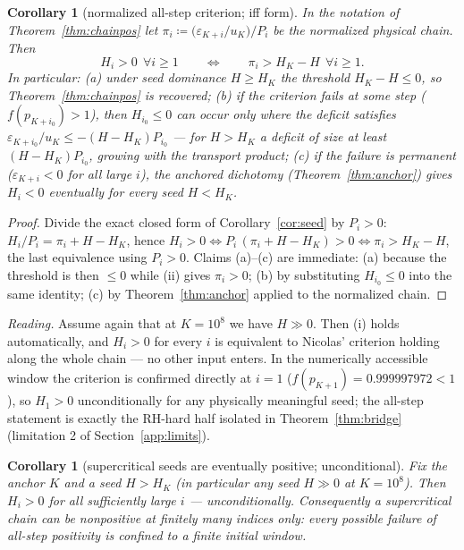 \documentclass[11pt]{article}
\newtheorem{corollary}[theorem]{Corollary}
\theoremstyle{remark}
\newcommand{\eps}{\varepsilon}
\begin{document}
\begin{corollary}[normalized all-step criterion; iff form]\label{cor:chainiff}
In the notation of Theorem~\ref{thm:chainpos} let
$\pi_i\coloneqq\bigl(\eps_{K+i}/u_K\bigr)\big/P_i$ be the \emph{normalized
physical chain}. Then
\[
H_i>0\ \ \forall i\ge1\qquad\Longleftrightarrow\qquad
\pi_i>H_K-H\ \ \forall i\ge1 .
\]
In particular: (a) under seed dominance $H\ge H_K$ the threshold
$H_K-H\le0$, so Theorem~\ref{thm:chainpos} is recovered; (b) if the
criterion fails at some step ($f(p_{K+i_0})>1$), then $H_{i_0}\le0$ can
occur only where the deficit satisfies
$\eps_{K+i_0}/u_K\le-(H-H_K)P_{i_0}$ --- for $H>H_K$ a deficit of size at
least $(H-H_K)P_{i_0}$, growing with the transport product; (c) if the
failure is permanent ($\eps_{K+i}<0$ for all large $i$), the anchored
dichotomy (Theorem~\ref{thm:anchor}) gives $H_i<0$ eventually for every
seed $H<H_K$.
\end{corollary}

\begin{proof}
Divide the exact closed form of Corollary~\ref{cor:seed} by $P_i>0$:
$H_i/P_i=\pi_i+H-H_K$, hence $H_i>0\iff P_i\,(\pi_i+H-H_K)>0
\iff\pi_i>H_K-H$, the last equivalence using $P_i>0$. Claims (a)--(c) are
immediate: (a) because the threshold is then $\le0$ while (ii) gives
$\pi_i>0$; (b) by substituting $H_{i_0}\le0$ into the same identity; (c) by
Theorem~\ref{thm:anchor} applied to the normalized chain.
\end{proof}

\emph{Reading.} Assume again that at $K=10^8$ we have $H\gg0$. Then (i)
holds automatically, and $H_i>0$ for every $i$ is equivalent to Nicolas'
criterion holding along the whole chain --- no other input enters. In the
numerically accessible window the criterion is confirmed directly at
$i=1$ ($f(p_{K+1})=0.999997972<1$), so $H_1>0$ unconditionally for any
physically meaningful seed; the all-step statement is exactly the RH-hard
half isolated in Theorem~\ref{thm:bridge} (limitation 2 of
Section~\ref{app:limits}).

\begin{corollary}[supercritical seeds are eventually positive; unconditional]
\label{cor:superpos}
Fix the anchor $K$ and a seed $H>H_K$ (in particular any seed $H\gg0$ at
$K=10^8$). Then $H_i>0$ for all sufficiently large $i$ ---
\emph{unconditionally}. Consequently a supercritical chain can be
nonpositive at finitely many indices only: every possible failure of
all-step positivity is confined to a finite initial window.
\end{corollary}
\end{document}
